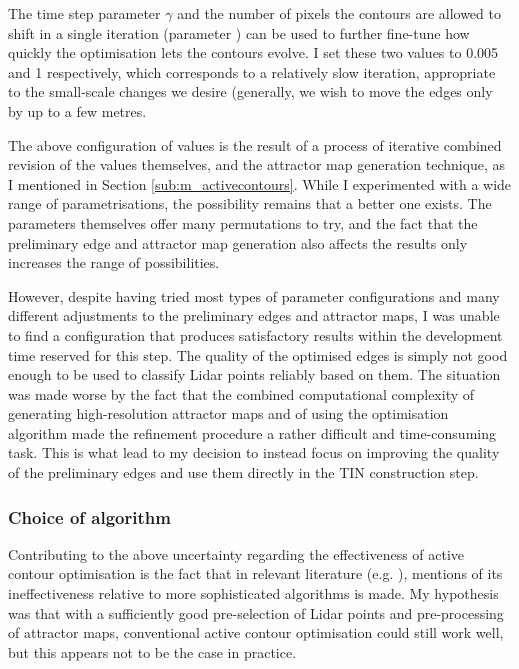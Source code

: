 The time step parameter $\gamma$ and the number of pixels the contours are allowed to shift in a single iteration (parameter ) can be used to further fine-tune how quickly the optimisation lets the contours evolve. I set these two values to 0.005 and 1 respectively, which corresponds to a relatively slow iteration, appropriate to the small-scale changes we desire (generally, we wish to move the edges only by up to a few metres.

The above configuration of values is the result of a process of iterative combined revision of the values themselves, and the attractor map generation technique, as I mentioned in Section \ref{sub:m_activecontours}. While I experimented with a wide range of parametrisations, the possibility remains that a better one exists. The parameters themselves offer many permutations to try, and the fact that the preliminary edge and attractor map generation also affects the results only increases the range of possibilities.  

However, despite having tried most types of parameter configurations and many different adjustments to the preliminary edges and attractor maps, I was unable to find a configuration that produces satisfactory results within the development time reserved for this step. The quality of the optimised edges is simply not good enough to be used to classify Lidar points reliably based on them. The situation was made worse by the fact that the combined computational complexity of generating high-resolution attractor maps and of using the optimisation algorithm made the refinement procedure a rather difficult and time-consuming task. This is what lead to my decision to instead focus on improving the quality of the preliminary edges and use them directly in the TIN construction step. 

\subsubsection{Choice of algorithm}

Contributing to the above uncertainty regarding the effectiveness of active contour optimisation is the fact that in relevant literature (e.g. \cite{boyko_funkhauser_2011}), mentions of its ineffectiveness relative to more sophisticated algorithms is made. My hypothesis was that with a sufficiently good pre-selection of Lidar points and pre-processing of attractor maps, conventional active contour optimisation could still work well, but this appears not to be the case in practice.

